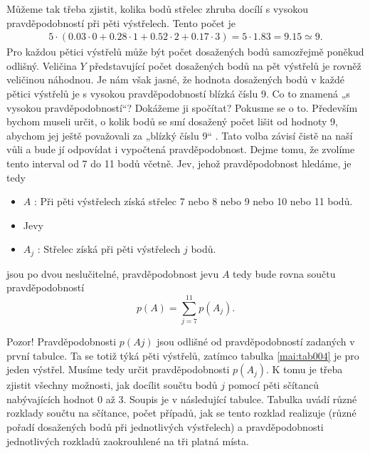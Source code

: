\begin{mdframed}[style=mdexam]
\begin{example}
    Můžeme tak třeba zjistit, kolika bodů střelec zhruba docílí s vysokou pravděpodobností při pěti
    výstřelech. Tento počet je
    \begin{gather*}
      5\cdot(\num{0.03}\cdot0 + \num{0.28}\cdot1 + \num{0.52}\cdot2 + \num{0.17}\cdot3) = 
      5\cdot\num{1.83} = \num{9.15} \simeq 9.
    \end{gather*}
    Pro každou pětici výstřelů může být počet dosažených bodů samozřejmě poněkud odlišný. Veličina
    \(Y\) představující počet dosažených bodů na pět výstřelů je rovněž veličinou náhodnou. Je nám
    však jasné, že hodnota dosažených bodů v každé pětici výstřelů je s vysokou pravděpodobností
    blízká číslu 9. Co to znamená „s vysokou pravděpodobností“? Dokážeme ji spočítat? Pokusme se o
    to. Především bychom museli určit, o kolik bodů se smí dosažený počet lišit od hodnoty 9,
    abychom jej ještě považovali za „blízký číslu 9“ . Tato volba závisí čistě na naší vůli a bude
    jí odpovídat i vypočtená pravděpodobnost. Dejme tomu, že zvolíme tento interval od 7 do 11 bodů
    včetně. Jev, jehož pravděpodobnost hledáme, je tedy
    \begin{itemize}
      \item \(A\) : Při pěti výstřelech získá střelec \num{7} nebo \num{8} nebo \num{9} nebo \num{10} 
            nebo \num{11} bodů.
      \item[] Jevy
      \item \(A_j\) : Střelec získá při pěti výstřelech \(j\) bodů.
    \end{itemize}
    jsou po dvou neslučitelné, pravděpodobnost jevu \(A\) tedy bude rovna součtu pravděpodobností
    \begin{equation*}
      p(A) = \sum_{j=7}^{11} p(A_j).
    \end{equation*}
   
    Pozor! Pravděpodobnosti \(p(Aj)\) jsou odlišné od pravděpodobností zadaných v první tabulce. Ta
    se totiž týká pěti výstřelů, zatímco tabulka \ref{mai:tab004} je pro jeden výstřel. Musíme tedy
    určit pravděpodobnosti \(p(A_j)\). K tomu je třeba zjistit všechny možnosti, jak docílit součtu
    bodů \(j\) pomocí pěti sčítanců nabývajících hodnot \num{0} až \num{3}. Soupis je v následující
    tabulce. Tabulka uvádí různé rozklady součtu na sčítance, počet případů, jak se tento rozklad
    realizuje (různé pořadí dosažených bodů při jednotlivých výstřelech) a pravděpodobnosti
    jednotlivých rozkladů zaokrouhlené na tři platná místa.


\end{example}
\end{mdframed}
